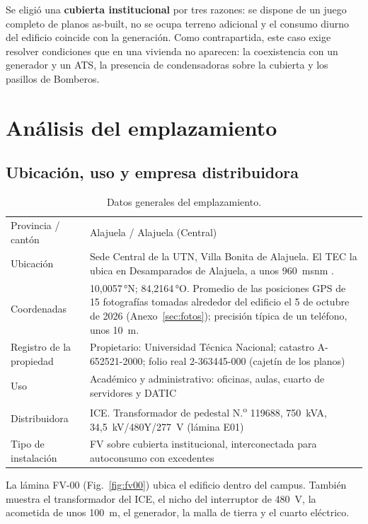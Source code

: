 \documentclass[12pt]{article}
\begin{document}
Se eligió una \textbf{cubierta institucional} por tres razones: se dispone de un juego completo de planos as-built, no se ocupa terreno adicional y el consumo diurno del edificio coincide con la generación. Como contrapartida, este caso exige resolver condiciones que en una vivienda no aparecen: la coexistencia con un generador y un ATS, la presencia de condensadoras sobre la cubierta y los pasillos de Bomberos.

\section{Análisis del emplazamiento}
\subsection{Ubicación, uso y empresa distribuidora}
\begin{table}[H]
\centering\small
\caption{Datos generales del emplazamiento.}\label{tab:sitio}
\begin{tabularx}{\textwidth}{L{4.6cm}Y}
\toprule
Provincia / cantón & Alajuela / Alajuela (Central)\\
Ubicación & Sede Central de la UTN, Villa Bonita de Alajuela. El TEC la ubica en Desamparados de Alajuela, a unos 960~msnm \cite{tecSitio}.\\
Coordenadas & 10,0057\,°N; 84,2164\,°O. Promedio de las posiciones GPS de 15 fotografías tomadas alrededor del edificio el 5 de octubre de 2026 (Anexo~\ref{sec:fotos}); precisión típica de un teléfono, unos \SI{10}{\meter}.\\
Registro de la propiedad & Propietario: Universidad Técnica Nacional; catastro A-652521-2000; folio real 2-363445-000 (cajetín de los planos)\\
Uso & Académico y administrativo: oficinas, aulas, cuarto de servidores y DATIC\\
Distribuidora & ICE. Transformador de pedestal N.\textsuperscript{o} 119688, 750~kVA, 34,5~kV/480Y/277~V (lámina E01)\\
Tipo de instalación & FV sobre cubierta institucional, interconectada para autoconsumo con excedentes\\
\bottomrule
\end{tabularx}
\end{table}

La lámina FV-00 (Fig.~\ref{fig:fv00}) ubica el edificio dentro del campus. También muestra el transformador del ICE, el nicho del interruptor de 480~V, la acometida de unos 100~m, el generador, la malla de tierra y el cuarto eléctrico.
\end{document}
